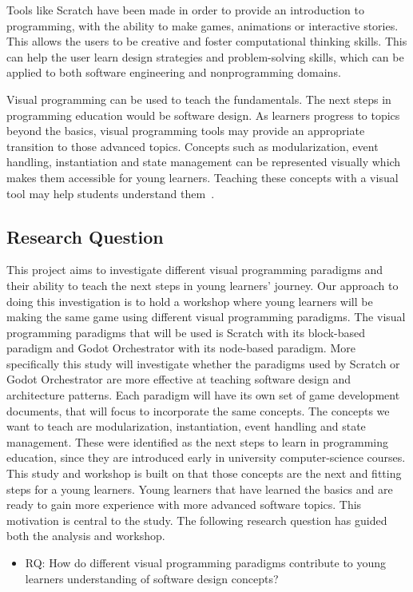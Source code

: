 Tools like Scratch have been made in order to provide an introduction to programming, with the ability to make games, animations or interactive stories.
This allows the users to be creative and foster computational thinking skills.
This can help the user learn design strategies and problem-solving skills, which can be applied to both software engineering and nonprogramming domains\cite{resnick_scratch_2009}.

Visual programming can be used to teach the fundamentals.
The next steps in programming education would be software design.
As learners progress to topics beyond the basics, visual programming tools may provide an appropriate transition to those advanced topics.
Concepts such as modularization, event handling, instantiation and state management can be represented visually which makes them accessible for young learners.
Teaching these concepts with a visual tool may help students understand them~\cite{Chao_exploring_problemsolving_through_visual_programming_2016}.

\subsection{Research Question}
This project aims to investigate different visual programming paradigms and their ability to teach the next steps in young learners' journey.
Our approach to doing this investigation is to hold a workshop where young learners will be making the same game using different visual programming paradigms.
The visual programming paradigms that will be used is Scratch with its block-based paradigm and Godot Orchestrator with its node-based paradigm.
More specifically this study will investigate whether the paradigms used by Scratch or Godot Orchestrator are more effective at teaching software design and architecture patterns.
Each paradigm will have its own set of game development documents, that will focus to incorporate the same concepts.
The concepts we want to teach are modularization, instantiation, event handling and state management.
These were identified as the next steps to learn in programming education, since they are introduced early in university computer-science courses.
This study and workshop is built on that those concepts are the next and fitting steps for a young learners.
Young learners that have learned the basics and are ready to gain more experience with more advanced software topics.
This motivation is central to the study.
The following research question has guided both the analysis and workshop.
\begin{itemize}
    \item RQ: How do different visual programming paradigms contribute to young learners understanding of software design concepts?
\end{itemize}